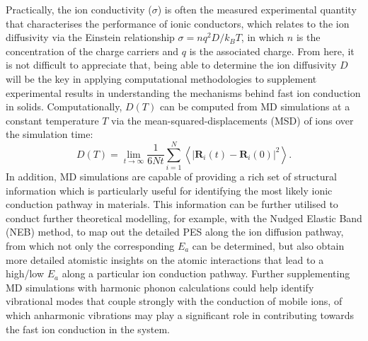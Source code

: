 Practically, the ion conductivity ($\sigma$) is often the measured experimental quantity that characterises the performance of ionic conductors, which relates to the ion diffusivity via the Einstein relationship $\sigma=nq^2D/k_B T$, in which $n$ is the concentration of the charge carriers and $q$ is the associated charge. From here, it is not difficult to appreciate that, being able to determine the ion diffusivity $D$ will be the key in applying computational methodologies to supplement experimental results in understanding the mechanisms behind fast ion conduction in solids. Computationally, $D(T)$ can be computed from MD simulations at a constant temperature $T$ via the mean-squared-displacements (MSD) of ions over the simulation time:
\begin{equation}
    \label{eq:ion_MSD}
    D(T)=\lim_{t\to \infty}\frac{1}{6Nt}\sum_{i=1}^{N}\left\langle \left\vert \bm{R}_i(t)-\bm{R}_i(0) \right\vert^2\right\rangle.
\end{equation}
In addition, MD simulations are capable of providing a rich set of structural information which is particularly useful for identifying the most likely ionic conduction pathway in materials. This information can be further utilised to conduct further theoretical modelling, for example, with the Nudged Elastic Band (NEB) method, to map out the detailed PES along the ion diffusion pathway,\cite{he2017origin} from which not only the corresponding $E_a$ can be determined, but also obtain more detailed atomistic insights on the atomic interactions that lead to a high/low $E_a$ along a particular ion conduction pathway. Further supplementing MD simulations with harmonic phonon calculations could help identify vibrational modes that couple strongly with the conduction of mobile ions, of which anharmonic vibrations may play a significant role in contributing towards the fast ion conduction in the system.
